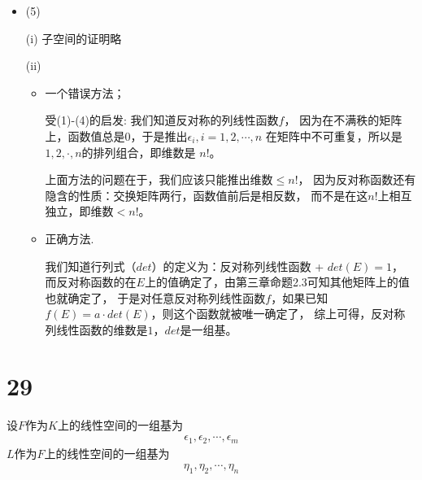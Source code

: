 \documentclass{article}
\begin{document}
\begin{itemize}
        综上，$(I)$就是$P(K)$的一组基，$P(K)$的维数是$n^n$.

  \item (5)

        (i) 子空间的证明略

        (ii)
        \begin{itemize}
          \item 一个错误方法；

                受(1)-(4)的启发: 我们知道反对称的列线性函数$f$，
                因为在不满秩的矩阵上，函数值总是0，于是推出$\epsilon_i, i = 1, 2, \cdots, n$
                在矩阵中不可重复，所以是$1, 2, \cdot, n$的排列组合，即维数是
                $n!$。

                上面方法的问题在于，我们应该只能推出维数$\leq n!$，
                因为反对称函数还有隐含的性质：交换矩阵两行，函数值前后是相反数，
                而不是在这$n!$上相互独立，即维数$< n!$。

          \item 正确方法.

                我们知道行列式（$det$）的定义为：反对称列线性函数 + $det(E) = 1$，
                而反对称函数的在$E$上的值确定了，由第三章命题2.3可知其他矩阵上的值也就确定了，
                于是对任意反对称列线性函数$f$，如果已知$f(E) = a \cdot det(E)$，则这个函数就被唯一确定了，
                综上可得，反对称列线性函数的维数是$1$，$det$是一组基。

        \end{itemize}

\end{itemize}

\section*{29}

设$F$作为$K$上的线性空间的一组基为
\begin{align*}
  \epsilon_1, \epsilon_2, \cdots, \epsilon_m
\end{align*}
$L$作为$F$上的线性空间的一组基为
\begin{align*}
  \eta_1, \eta_2, \cdots, \eta_n
\end{align*}
\end{document}
